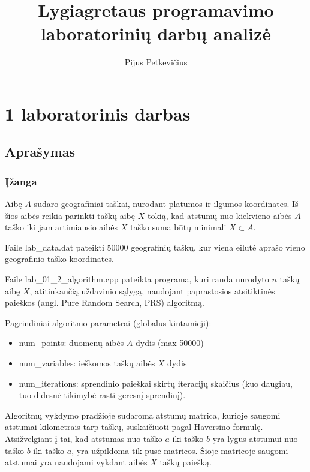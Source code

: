 \documentclass[a4paper,10pt]{article}
\title{Lygiagretaus programavimo laboratorinių darbų analizė}
\author{Pijus Petkevičius}
\begin{document}
\maketitle
\newpage
\tableofcontents
\newpage

\section{1 laboratorinis darbas}
\subsection{Aprašymas}
\subsubsection{Įžanga}
Aibę $A$ sudaro geografiniai taškai, nurodant platumos ir ilgumos koordinates.
Iš šios aibės reikia parinkti taškų aibę $X$ tokią, kad atstumų nuo kiekvieno aibės $A$ taško iki jam artimiausio aibės $X$ taško suma būtų minimali $X  \subset A $.

Faile lab\_data.dat pateikti 50000 geografinių taškų, kur viena eilutė aprašo vieno geografinio taško koordinates.

Faile lab\_01\_2\_algorithm.cpp pateikta programa, kuri randa nurodyto $n$ taškų aibę $X$, atitinkančią uždavinio sąlygą, naudojant paprastosios atsitiktinės paieškos (angl. Pure Random Search, PRS) algoritmą.

\noindent Pagrindiniai algoritmo parametrai (globalūs kintamieji):
\begin{itemize}
	\item num\_points: duomenų aibės $A$ dydis (max 50000)
	\item num\_variables: ieškomos taškų aibės $X$ dydis
	\item num\_iterations: sprendinio paieškai skirtų iteracijų skaičius (kuo daugiau, tuo didesnė tikimybė rasti geresnį sprendinį).
\end{itemize}

Algoritmų vykdymo pradžioje sudaroma atstumų matrica, kurioje saugomi atstumai kilometrais tarp taškų, suskaičiuoti pagal Haversino formulę.
Atsižvelgiant į tai, kad atstumas nuo taško $a$ iki taško $b$ yra lygus atstumui nuo taško $b$ iki taško $a$, yra užpildoma tik pusė matricos.
Šioje matricoje saugomi atstumai yra naudojami vykdant aibės $X$ taškų paiešką.
\end{document}
